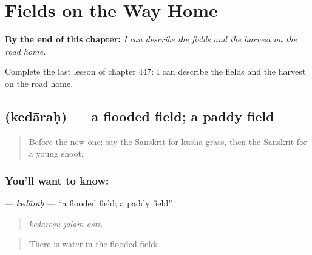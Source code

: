 
\chapter{Fields on the Way Home}
\label{ch:sa-fields-on-the-way-home}

\begin{chapteropening}
\textbf{By the end of this chapter:} \emph{I can describe the fields and the harvest on the road home.}

Complete the last lesson of chapter 447: I can describe the fields and the harvest on the road home.
\end{chapteropening}

\section[\texorpdfstring{\sk{केदारः} (kedāraḥ)}{केदारः (kedāraḥ)}]{ (kedāraḥ) — a flooded field; a paddy field}

\label{lesson:SA-C447-kedarah}



\begin{quote}
Before the new one: say the Sanskrit for kusha grass, then the Sanskrit for a young shoot.
\end{quote}

\subsection*{You'll want to know: }
\textbf{} — \emph{kedāraḥ} — \textquotedblleft{}a flooded field; a paddy field\textquotedblright{}.

\begin{quote}
  
\end{quote}

\begin{quote}
\emph{kedāreṣu jalam asti.}
\end{quote}

\begin{quote}
There is water in the flooded fields.
\end{quote}

